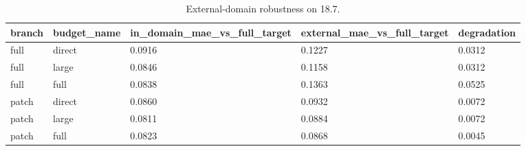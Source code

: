 \begin{table}[t]
\centering
\caption{External-domain robustness on 18.7.}
\label{tab:external}
\scriptsize
\begin{tabular}{lllll}
\toprule
branch & budget\_name & in\_domain\_mae\_vs\_full\_target & external\_mae\_vs\_full\_target & degradation \\
\midrule
full & direct & 0.0916 & 0.1227 & 0.0312 \\
full & large & 0.0846 & 0.1158 & 0.0312 \\
full & full & 0.0838 & 0.1363 & 0.0525 \\
patch & direct & 0.0860 & 0.0932 & 0.0072 \\
patch & large & 0.0811 & 0.0884 & 0.0072 \\
patch & full & 0.0823 & 0.0868 & 0.0045 \\
\bottomrule
\end{tabular}
\end{table}
